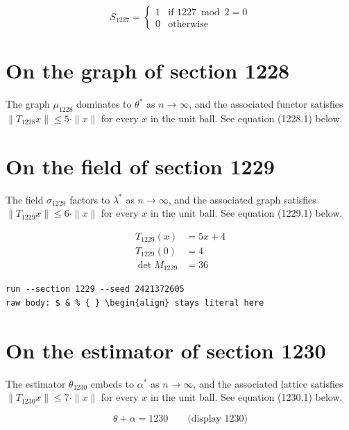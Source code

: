 \documentclass{article}
\begin{document}
\begin{equation}
S_{1227} = \begin{cases} 1 & \text{if } 1227 \bmod 2 = 0 \\ 0 & \text{otherwise} \end{cases}
\end{equation}

\section{On the graph of section 1228}
The graph $\mu_{1228}$ dominates to $\theta^{*}$ as $n \to \infty$,
and the associated functor satisfies $\|T_{1228} x\| \leq 5 \cdot \|x\|$
for every $x$ in the unit ball. See equation (1228.1) below.

\section{On the field of section 1229}
The field $\sigma_{1229}$ factors to $\lambda^{*}$ as $n \to \infty$,
and the associated graph satisfies $\|T_{1229} x\| \leq 6 \cdot \|x\|$
for every $x$ in the unit ball. See equation (1229.1) below.

\begin{align}
T_{1229}(x) &= 5 x + 4 \\
T_{1229}(0) &= 4 \\
\det M_{1229} &= 36
\end{align}

\begin{verbatim}
run --section 1229 --seed 2421372605
raw body: $ & % { } \begin{align} stays literal here
\end{verbatim}

\section{On the estimator of section 1230}
The estimator $\theta_{1230}$ embeds to $\alpha^{*}$ as $n \to \infty$,
and the associated lattice satisfies $\|T_{1230} x\| \leq 7 \cdot \|x\|$
for every $x$ in the unit ball. See equation (1230.1) below.

$$
\theta + \alpha = 1230 \qquad \text{(display 1230)}
$$
\end{document}
